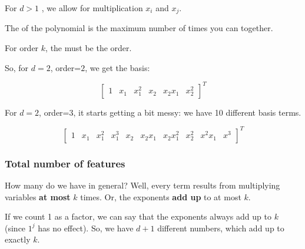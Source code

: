                \begin{definition}
                    For  $d>1$ , we allow for multiplication  $x_i$ and $x_j$.

                    The  of the polynomial is the maximum number of times you can  together. 
                    
                    For order $k$, the  must be  the order.
                \end{definition}

                So, for $d=2$, order=$2$, we get the basis:

                \begin{equation}
                    \begin{bmatrix}
                        1 & x_1 & x_1^2 & x_2 & x_2x_1 & x_2^2
                    \end{bmatrix}^T
                \end{equation}

                For $d=2$, order=$3$, it starts getting a bit messy: we have 10 different basis terms.

                \begin{equation}
                    \begin{bmatrix}
                        1 & x_1 & x_1^2 & x_1^3 &
                        x_2 & x_2x_1 & x_2x_1^2 & x_2^2 &
                        x^2x_1 & x^3
                    \end{bmatrix}^T
                \end{equation}

            \subsecdiv
            \subsubsection*{Total number of features}
        
                How many do we have in general? Well, every term results from multiplying variables \textbf{at most} $k$ times. Or, the exponents \textbf{add up} to at most $k$.
                
                If we count 1 as a factor, we can say that the exponents always add up to $k$ (since $1^j$ has no effect). So, we have $d+1$ different numbers, which add up to exactly $k$.

